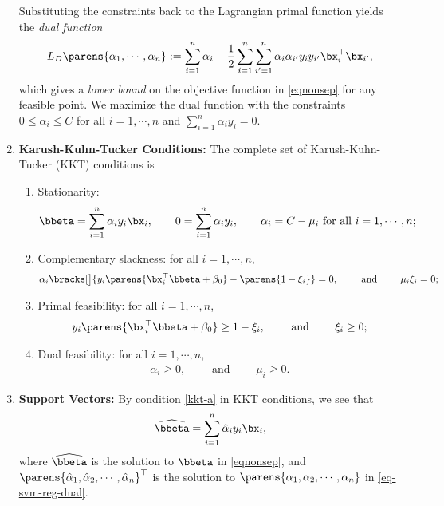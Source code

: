 \documentclass[12pt]{article}
\begin{document}
\begin{enumerate}[label=\textbf{\arabic*.}]
	Substituting the constraints back to the Lagrangian primal function yields the \textit{dual function} 
	\begin{align*}
		L_D \parens{\alpha_1, \cdots, \alpha_n} := \sum_{i=1}^n \alpha_i - \frac{1}{2} \sum_{i=1}^n \sum_{i'=1}^n \alpha_i \alpha_{i'} y_i y_{i'} \bx_i^\top \bx_{i'}, 
	\end{align*}
	which gives a \emph{lower bound} on the objective function in \eqref{eqnonsep} for any feasible point. We maximize the dual function with the constraints $0 \le \alpha_i \le C$ for all $i = 1, \cdots, n$ and $\sum_{i=1}^n \alpha_i y_i = 0$. 
	
	\item \textbf{Karush-Kuhn-Tucker Conditions:} The complete set of Karush-Kuhn-Tucker (KKT) conditions is 
	\begin{enumerate}[label=(\alph*)]
		\item \label{kkt-a} Stationarity: 
		\begin{align*}
			\bbeta = \sum_{i=1}^n \alpha_i y_i \bx_i, \qquad 0 = \sum_{i=1}^n \alpha_i y_i, \qquad \alpha_i = C - \mu_i \text{ for all } i = 1, \cdots, n; 
		\end{align*}
		\item \label{kkt-b} Complementary slackness: for all $i = 1, \cdots, n$, 
		\begin{align*}
			\alpha_i \bracks[\big]{ y_i \parens{\bx_i^\top \bbeta + \beta_0} - \parens{1 - \xi_i}} = 0, \qquad \text{ and } \qquad \mu_i \xi_i = 0; 
		\end{align*}
		\item \label{kkt-c} Primal feasibility: for all $i = 1, \cdots, n$, 
		\begin{align*}
			y_i \parens{\bx_i^\top \bbeta + \beta_0} \ge 1 - \xi_i, \qquad \text{ and } \qquad \xi_i \ge 0; 
		\end{align*}
		\item \label{kkt-d} Dual feasibility: for all $i = 1, \cdots, n$, 
		\begin{align*}
			\alpha_i \ge 0, \qquad \text{ and } \qquad \mu_i \ge 0. 
		\end{align*}
	\end{enumerate}
	
	\item \textbf{Support Vectors:} By condition \ref{kkt-a} in KKT conditions, we see that 
	\begin{align*}
		\widehat{\bbeta} = \sum_{i=1}^n \hat{\alpha}_i y_i \bx_i, 
	\end{align*} 
	where $\widehat{\bbeta}$ is the solution to $\bbeta$ in \eqref{eqnonsep}, and $\parens{\hat{\alpha}_1, \hat{\alpha}_2, \cdots, \hat{\alpha}_n}^\top$ is the solution to $\parens{\alpha_1, \alpha_2, \cdots, \alpha_n}$ in \eqref{eq-svm-reg-dual}. 
	

\end{enumerate}
\end{document}
